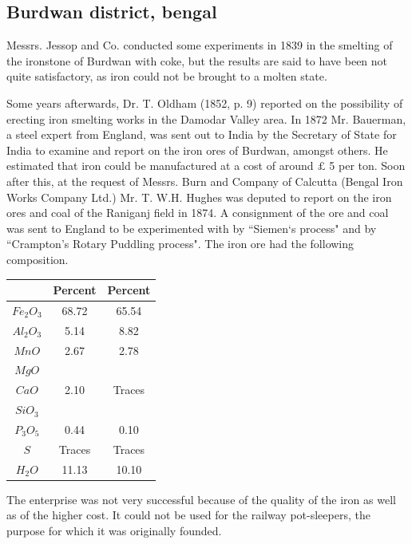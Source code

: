 \vspace{-.3cm}

\subsection*{Burdwan district, bengal}

\vspace{-.2cm}

Messrs. Jessop and Co. conducted some experiments in 1839 in the smelting of the ironstone of Burdwan with coke, but the results are said to have been not quite satisfactory, as iron could not be brought to a molten state. 

Some years afterwards, Dr. T. Oldham (1852, p. 9) reported on the possibility of erecting iron smelting works in the Damodar Valley area. In 1872 Mr. Bauerman, a steel expert from England, was sent out to India by the Secretary of State for India to examine and report on the iron ores of Burdwan, amongst others. He estimated that iron could be manufactured at a cost of around $£$ 5 per ton.  Soon after this, at the request of Messrs. Burn and Company of Calcutta (Bengal Iron Works Company Ltd.) Mr. T. W.H. Hughes was deputed to report on the iron ores and coal of the Raniganj field in 1874.  A consignment of the ore and coal was sent to England to be experimented with by ``Siemen`s process" and by ``Crampton's Rotary Puddling process".  The iron ore had the following composition.

\newpage

{\fontsize{8}{10}\selectfont
\begin{center}
\begin{tabular}{|c|c|c|}
\hline
 & Percent & Percent\\\hline
$Fe_2O_3$ & 68.72 & 65.54\\ \hline
$Al_2O_3$ & 5.14 & 8.82\\ \hline
$MnO$ & 2.67 & 2.78\\ \hline
$MgO$ & & \\
$CaO$ & 2.10 & Traces\\ 
$SiO_3$ & & \\ \hline
$P_3O_5$ & 0.44 & 0.10\\ \hline
$S$ & Traces & Traces \\ \hline
$H_2O$ & 11.13 & 10.10\\ \hline
\end{tabular}
\end{center}
}

The enterprise was not very successful because of the quality of the iron as well as of the higher cost.  It could not be used for the railway pot-sleepers, the purpose for which it was originally founded.

